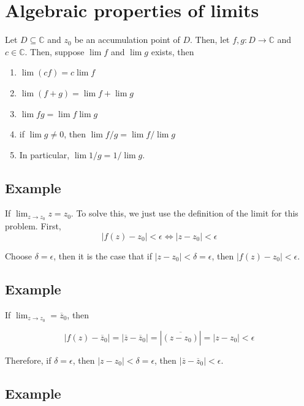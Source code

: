 \documentclass{article}
\newtheorem{one minute paper}[theorem]{One Minute Paper}
\begin{document}
\section*{Algebraic properties of limits}

Let $D \subseteq \mathbb{C}$ and $z_0$ be an accumulation point of $D$. Then, let $f,g: D \rightarrow \mathbb{C}$ and $c \in \mathbb{C}$. Then, suppose $\lim f$ and $\lim g$ exists, then 
\begin{enumerate}
    \item $\lim (cf) = c\lim f$
    \item $\lim (f + g) = \lim f + \lim g$
    \item $\lim fg = \lim f \lim g$
    \item if $\lim g \neq 0$, then $\lim f/g = \lim f/\lim g$
    \item In particular, $\lim 1/g = 1/\lim g$. 
\end{enumerate}

\subsection*{Example}

If $\lim_{z \rightarrow z_0} z = z_0$. To solve this, we just use the definition of the limit for this problem. First, 
\begin{equation}
    |f(z) - z_0| < \epsilon \iff |z - z_0| < \epsilon
\end{equation}

Choose $\delta = \epsilon$, then it is the case that if $|z - z_0| < \delta = \epsilon$, then $|f(z) - z_0| < \epsilon$.  

\subsection*{Example}

If $\lim_{z\rightarrow z_0} = \overline{z}_0$, then 

\begin{equation}
    |f(z) - \overline{z}_0| = |\overline{z} - \overline{z}_0| = |\overline{(z- z_0)}| = |z - z_0| < \epsilon
\end{equation}

Therefore, if $\delta = \epsilon$, then $|z - z_0| < \delta =\epsilon$, then $|\overline{z} - \overline{z}_0| < \epsilon$. 

\subsection*{Example}
\end{document}
